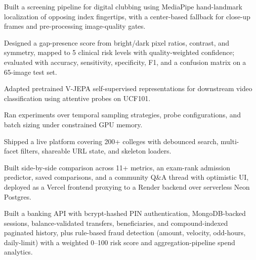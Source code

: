 \documentclass[a4paper,10pt]{article}
\begin{document}
\begin{points}
  \item Built a screening pipeline for digital clubbing using MediaPipe hand-landmark localization of opposing index fingertips, with a center-based fallback for close-up frames and pre-processing image-quality gates.
  \item Designed a gap-presence score from bright/dark pixel ratios, contrast, and symmetry, mapped to 5 clinical risk levels with quality-weighted confidence; evaluated with accuracy, sensitivity, specificity, F1, and a confusion matrix on a 65-image test set.
\end{points}
\gap

\begin{points}
  \item Adapted pretrained V-JEPA self-supervised representations for downstream video classification using attentive probes on UCF101.
  \item Ran experiments over temporal sampling strategies, probe configurations, and batch sizing under constrained GPU memory.
\end{points}
\gap

\begin{points}
  \item Shipped a live platform covering 200+ colleges with debounced search, multi-facet filters, shareable URL state, and skeleton loaders.
  \item Built side-by-side comparison across 11+ metrics, an exam-rank admission predictor, saved comparisons, and a community Q\&A thread with optimistic UI, deployed as a Vercel frontend proxying to a Render backend over serverless Neon Postgres.
\end{points}
\gap

\begin{points}
  \item Built a banking API with bcrypt-hashed PIN authentication, MongoDB-backed sessions, balance-validated transfers, beneficiaries, and compound-indexed paginated history, plus rule-based fraud detection (amount, velocity, odd-hours, daily-limit) with a weighted 0--100 risk score and aggregation-pipeline spend analytics.
\end{points}
\end{document}
